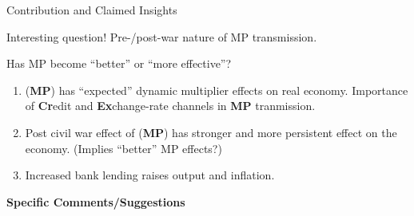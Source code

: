 \documentclass[10pt,english,slidetop,compress,
              blue,mathserif,color=option]{beamer}
\theoremstyle{plain}
\theoremstyle{definition}
\begin{document}
\begin{frame}{Contribution and Claimed Insights}

  \begin{block}{Interesting question!}
    Pre-/post-war nature of MP transmission. 
    \bigskip
    
    \hfill Has MP become ``better'' or ``more effective''?
  \end{block}
  
  \bigskip

  \bigskip

  \begin{enumerate}
    \item (\textbf{MP}) has ``expected'' dynamic multiplier effects on real economy. Importance of \textbf{Cr}edit and \textbf{Ex}change-rate channels in \textbf{MP} tranmission.
    
    \bigskip

    \item Post civil war effect of (\textbf{MP}) has stronger and more persistent effect on the economy. (Implies ``better'' MP effects?)
    
    \bigskip

  \item Increased bank lending raises output and inflation.
  \end{enumerate}
  
\end{frame}

{
  \begin{frame}
    \begin{center}
      \bigskip
      \bigskip
      {\Huge\bfseries{\color{orange}Specific Comments/Suggestions}}
      \bigskip

    \end{center}
  \end{frame}
}
\end{document}
